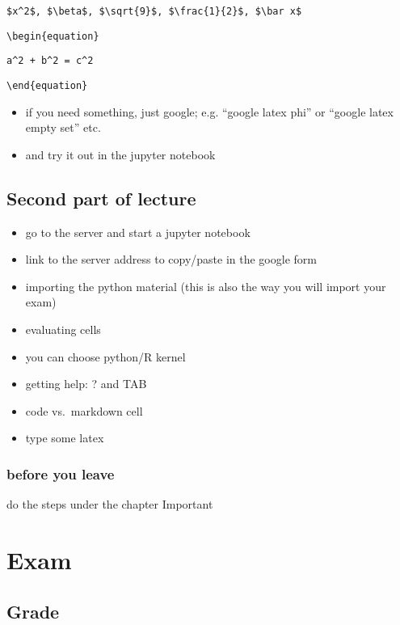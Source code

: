 \documentclass[]{book}
\providecommand{\tightlist}{%
  \setlength{\itemsep}{0pt}\setlength{\parskip}{0pt}}
\begin{document}
\texttt{\$x\^{}2\$,\ \$\textbackslash{}beta\$,\ \$\textbackslash{}sqrt\{9\}\$,\ \$\textbackslash{}frac\{1\}\{2\}\$,\ \$\textbackslash{}bar\ x\$}

\texttt{\textbackslash{}begin\{equation\}}

\texttt{a\^{}2\ +\ b\^{}2\ =\ c\^{}2}

\texttt{\textbackslash{}end\{equation\}}

\begin{itemize}
\tightlist
\item
  if you need something, just google; e.g. ``google latex phi'' or
  ``google latex empty set'' etc.
\item
  and try it out in the jupyter notebook
\end{itemize}

\section{Second part of lecture}\label{second-part-of-lecture}

\begin{itemize}
\item
  go to the server and start a jupyter notebook
\item
  link to the server address to copy/paste in the google form
\item
  importing the python material (this is also the way you will import
  your exam)
\item
  evaluating cells
\item
  you can choose python/R kernel
\item
  getting help: ? and TAB
\item
  code vs.~markdown cell
\item
  type some latex
\end{itemize}

\subsection{before you leave}\label{before-you-leave}

do the steps under the chapter Important

\chapter{Exam}\label{exam-1}

\section{Grade}\label{grade}
\end{document}
